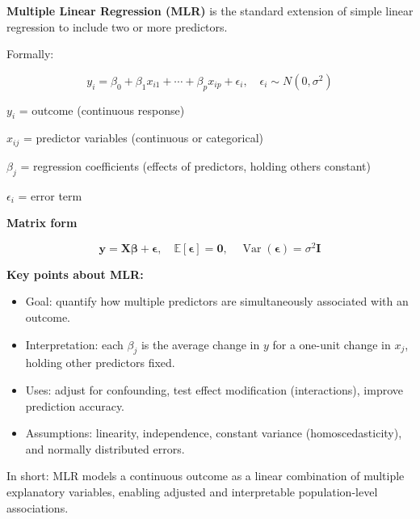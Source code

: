 \documentclass[
  letterpaper,
  DIV=11,
  numbers=noendperiod]{scrreprt}
\begin{document}
\begin{tcolorbox}[enhanced jigsaw, breakable, colbacktitle=quarto-callout-important-color!10!white, left=2mm, colframe=quarto-callout-important-color-frame, opacityback=0, coltitle=black, colback=white, rightrule=.15mm, title=\textcolor{quarto-callout-important-color}{\faExclamation}\hspace{0.5em}{Important}, titlerule=0mm, opacitybacktitle=0.6, leftrule=.75mm, toprule=.15mm, arc=.35mm, bottomtitle=1mm, toptitle=1mm, bottomrule=.15mm]

\textbf{Multiple Linear Regression (MLR)} is the standard extension of
simple linear regression to include two or more predictors.

Formally:

\[
y_i = \beta_0 + \beta_1 x_{i1} + \cdots + \beta_p x_{ip} + \epsilon_i,
\quad \epsilon_i \sim N(0,\sigma^2)
\]

\(y_i\) = outcome (continuous response)

\(x_{ij}\) = predictor variables (continuous or categorical)

\(\beta_j\) = regression coefficients (effects of predictors, holding
others constant)

\(\epsilon_i\) = error term

\textbf{Matrix form}

\[
\mathbf{y} = \mathbf{X}\boldsymbol{\beta} + \boldsymbol{\epsilon}, 
\quad \mathbb{E}[\boldsymbol{\epsilon}] = \mathbf{0}, 
\quad \operatorname{Var}(\boldsymbol{\epsilon}) = \sigma^2 \mathbf{I}
\]

\textbf{Key points about MLR:}

\begin{itemize}
\item
  Goal: quantify how multiple predictors are simultaneously associated
  with an outcome.
\item
  Interpretation: each \(\beta_j\) is the average change in \(y\) for a
  one-unit change in \(x_{j}\), holding other predictors fixed.
\item
  Uses: adjust for confounding, test effect modification (interactions),
  improve prediction accuracy.
\item
  Assumptions: linearity, independence, constant variance
  (homoscedasticity), and normally distributed errors.
\end{itemize}

In short: MLR models a continuous outcome as a linear combination of
multiple explanatory variables, enabling adjusted and interpretable
population-level associations.

\end{tcolorbox}
\end{document}
